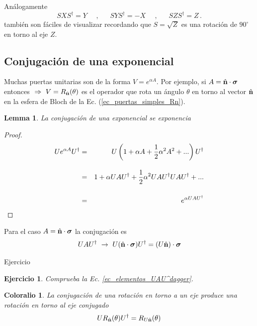 \documentclass[a4paper,11pt]{book} %
\newtheorem{lemma_contador}{Lemma}
\newcommand{\Lemma}[1]{
		\begin{mybox_gray2}{}
			\begin{lemma_contador}
				 #1 
			\end{lemma_contador} 
		\end{mybox_gray2}
	}
\newtheorem{corolario_contador}{Coloralio}
\newcommand{\Corolario}[1]{
		\begin{mybox_gray2}{}
			\begin{corolario_contador}
				 #1 
			\end{corolario_contador} 
		\end{mybox_gray2}
	}
\newtheorem{ejercicio_contador}{Ejercicio}
\newcommand{\Ejercicio}[1]{
		\begin{mybox_gray}{Ejercicio} 
			\begin{ejercicio_contador}
				 #1 
			\end{ejercicio_contador} 
		\end{mybox_gray}
	}
\numberwithin{equation}{chapter}
\begin{document}
Análogamente
	\begin{equation*}
	S X S^\dagger  = Y ~~~~~~, ~~~~~~~ 
	S Y S^\dagger = -X ~~~~~~, ~~~~~~~ 
	S Z S^\dagger = Z \, .
	\end{equation*}
también  son fáciles de visualizar recordando que  $S=\sqrt{Z}$ es una rotación de $90^\circ$ en torno al eje $Z$.


        \subsection{Conjugación de una exponencial}

Muchas puertas unitarias son de la forma $V = e^{\alpha A}$. Por ejemplo, si  $A = \hat{\bf n}\cdot \boldsymbol{\sigma} $ entonces $  ~\Rightarrow ~V= R_{\hat{\bf n}}(\theta)$ es el operador que rota un ángulo $\theta$ en torno al vector $\hat{\bf n}$ en la esfera de Bloch de la Ec. (\ref{ec_puertas_simples_Rn}).

	\Lemma{
	La conjugación de una exponencial se exponencia
	}
	
	\begin{proof}
	\begin{eqnarray}
	U e^{\alpha A} U^\dagger &=&  U \left(1 + \alpha A  + \frac{1}{2} \alpha^2 A^2 + ... \right) U^\dagger \\ \rule{0mm}{8mm}
	&=& 1 + \alpha UAU^\dagger + \frac{1}{2}\alpha^2 UAU^\dagger U AU^\dagger + ... \\ \rule{0mm}{8mm}
	&=& e^{ \alpha UAU^\dagger} 
	\end{eqnarray}
	\end{proof}

Para el caso $A = \hat{\bf n}\cdot \boldsymbol{\sigma} $  la conjugación es
	\begin{equation} \label{ec_elementos_UAU^dagger}
	U A U^\dagger ~\to ~U (\hat{\bf n}\cdot \boldsymbol{\sigma} ) U^\dagger = (U\hat{\bf n})\cdot  \boldsymbol{\sigma}
	\end{equation}

	\Ejercicio{
	Comprueba la Ec. \ref{ec_elementos_UAU^dagger}.
	}

	\Corolario{
	La conjugación de una rotación en torno a un eje produce una rotación en torno al eje conjugado
	\begin{equation}
	U R_{\hat{\bf n}}(\theta) U^\dagger = R_{U\hat{\bf n}}(\theta)
	\end{equation}
	}
	
\end{document}
